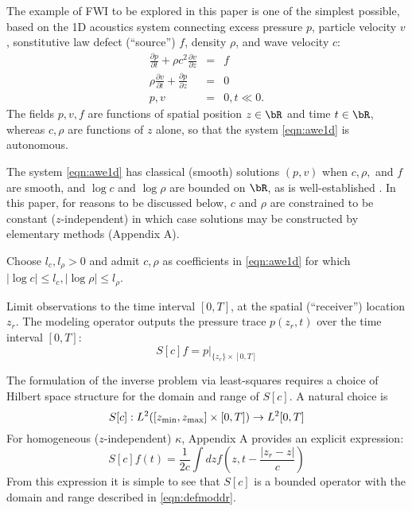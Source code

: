 The example of FWI to be explored in this paper is one of the simplest possible, based on the 1D acoustics system connecting excess pressure $p$, particle velocity $v$, sonstitutive law defect (``source'') $f$, density $\rho$, and wave velocity $c$:
\begin{eqnarray}
\label{eqn:awe1d}
\frac{\partial p}{\partial t} + \rho c^2\frac{\partial 
  v}{\partial z} &=& f \nonumber\\
\rho \frac{\partial v}{\partial t} + \frac{\partial p}{\partial 
  z}&=&0\nonumber\\
 p,v&=&0, t \ll 0. 
\end{eqnarray}
The fields $p,v,f$ are functions of spatial position $z \in \bR$ and time $t \in \bR$, whereas $c, \rho$ are functions of $z$ alone, so that the system \ref{eqn:awe1d} is autonomous.

The system \ref{eqn:awe1d} has classical (smooth) solutions $(p,v)$ when $c, \rho,$ and $f$ are smooth, and $\log c$ and $\log \rho$ are bounded on $\bR$, as is well-established \cite[]{Lax:PDENotes}. In this paper, for reasons to be discussed below, $c$ and $\rho$ are constrained to be constant ($z$-independent) in which case solutions may be constructed by elementary methods (Appendix A).

Choose $l_c, l_{\rho} >0$ and admit $c, \rho$ as coefficients in \ref{eqn:awe1d} for which $|\log c| \le l_c, |\log \rho| \le l_{\rho}$.

Limit observations to the time interval $[0,T]$, at the spatial (``receiver'')  location $z_r$. The modeling operator outputs the pressure trace $p(z_r,t)$ over the time interval $[0,T]$:
\begin{equation}
  \label{eqn:defmod}
  S[c]f = p|_{\{z_r\}\times [0,T]}
\end{equation}

The formulation of the inverse problem via least-squares requires a choice of Hilbert space structure for the domain and range of $S[c]$. A natural choice is
\begin{equation}
  
  S[c]: L^2([z_{\rm min},z_{\rm max}] \times [0,T]) \rightarrow L^2[0,T]
\end{equation}
For homogeneous ($z$-independent) $\kappa$, Appendix A provides an explicit expression:
\begin{equation}
  \label{eqn:defmodhom}
  S[c]f(t) = \frac{1}{2c}\int dz f\left(z,t - \frac{|z_r-z|}{c}\right) 
\end{equation}
From this expression it is simple to see that $S[c]$ is a bounded operator with the domain and range described in \ref{eqn:defmoddr}.


